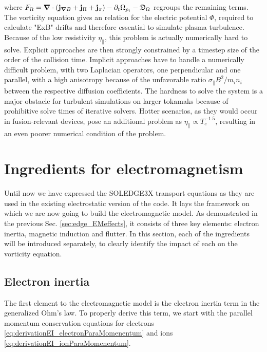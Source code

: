 where $F_\Omega = \grad\cdot\left(\mathbf{j}_{\grad B} + \mathbf{j}_{\Pi} + \mathbf{j}_{\pi}\right) - \partial_t \Omega_{p_i}  - \mathfrak{D}_\Omega$ regroups the remaining terms. \\
The vorticity equation gives an relation for the electric potential $\Phi$, required to calculate "ExB" drifts and therefore essential to simulate plasma turbulence. Because of the low resistivity $\eta_\parallel$, this problem is actually numerically hard to solve. Explicit approaches are then strongly constrained by a timestep size of the order of the collision time. Implicit approaches have to handle a numerically difficult problem, with two Laplacian operators, one perpendicular and one parallel, with a high anisotropy because of the unfavorable ratio $\sigma_\parallel B^2 / m_in_i$ between the respective diffusion coefficients. The hardness to solve the system is a major obstacle for turbulent simulations on larger tokamaks because of prohibitive solve times of iterative solvers. Hotter scenarios, as they would occur in fusion-relevant devices, pose an additional problem as $\eta_\parallel\propto T_e^{-1.5}$, resulting in an even poorer numerical condition of the problem. 



\section{Ingredients for electromagnetism}
\label{sec:S3X_electromagneticModel}

Until now we have expressed the SOLEDGE3X transport equations as they are used in the existing electrostatic version of the code. It lays the framework on which we are now going to build the electromagnetic model. As demonstrated in the previous Sec. \ref{sec:edge_EMeffects}, it consists of three key elements: electron inertia, magnetic induction and flutter. In this section, each of the ingredients will be introduced separately, to clearly identify the impact of each on the vorticity equation. 


\subsection{Electron inertia}
\label{ssec:ModelElectronInertia}


The first element to the electromagnetic model is the electron inertia term in the generalized Ohm's law. To properly derive this term, we start with the parallel momentum conservation equations for electrons \ref{eq:derivationEI_electronParaMomenentum} and ions \ref{eq:derivationEI_ionParaMomenentum}.

